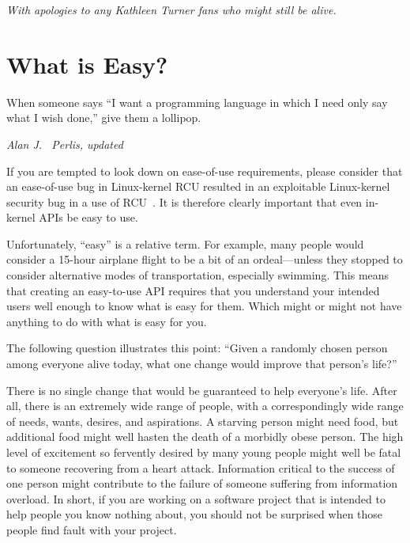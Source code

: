 
%
	 {\emph{With apologies to any Kathleen Turner fans who might
	  still be alive.}}

\section{What is Easy?}
\label{sec:easy:What is Easy?}
%
\epigraph{When someone says ``I want a programming language in which I
	  need only say what I wish done,'' give them a lollipop.}
	 {\emph{Alan J.~ Perlis, updated}}

If you are tempted to look down on ease-of-use requirements, please
consider that an ease-of-use bug in Linux-kernel RCU resulted in an
exploitable Linux-kernel security bug in a use of
RCU~\cite{McKenney:2019:CRS:3319647.3325836}.
It is therefore clearly important that even in-kernel APIs be easy to use.

Unfortunately, ``easy'' is a relative term.
For example, many people would consider a 15-hour airplane flight to be
a bit of an ordeal---unless they stopped to consider alternative modes
of transportation, especially swimming.
This means that creating an easy-to-use API requires that you understand
your intended users well enough to know what is easy for them.
Which might or might not have anything to do with what is easy for you.

The following question illustrates this point: ``Given a randomly chosen
person among everyone alive today, what one change would
improve that person's life?''

There is no single change that would be guaranteed to help everyone's life.
After all, there is an extremely wide range of people, with a correspondingly
wide range of needs, wants, desires, and aspirations.
A starving person might need food, but additional food might well hasten
the death of a morbidly obese person.
The high level of excitement so fervently desired by many young people
might well be fatal to someone recovering from a heart attack.
Information critical to the success of one person might contribute to
the failure of someone suffering from information overload.
In short, if you are working on a software project that is intended to
help people you know nothing about, you should not be surprised when
those people find fault with your project.

